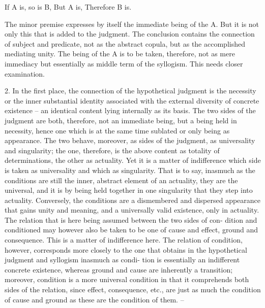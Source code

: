 If A is, so is B,
But A is,
Therefore B is.

The minor premise expresses by itself
the immediate being of the A.
But it is not only this that is added to the judgment.
The conclusion contains the connection of subject and predicate,
not as the abstract copula,
but as the accomplished mediating unity. 
The being of the A is to be taken, therefore, 
not as mere immediacy but essentially
as middle term of the syllogism. 
This needs closer examination.

2. In the first place, the connection of the hypothetical judgment is
the necessity or the inner substantial identity associated with the external
diversity of concrete existence – an identical content lying internally as its
basis. The two sides of the judgment are both, therefore, not an immediate
being, but a being held in necessity, hence one which is at the same time
sublated or only being as appearance. The two behave, moreover, as sides
of the judgment, as universality and singularity; the one, therefore, is the
above content as totality of determinations, the other as actuality. Yet it is
a matter of indifference which side is taken as universality and which as
singularity. That is to say, inasmuch as the conditions are still the inner,
abstract element of an actuality, they are the universal, and it is by being
held together in one singularity that they step into actuality. Conversely, the
conditions are a dismembered and dispersed appearance that gains unity and
meaning, and a universally valid existence, only in actuality.
The relation that is here being assumed between the two sides of con-
dition and conditioned may however also be taken to be one of cause and
effect, ground and consequence. This is a matter of indifference here. The
relation of condition, however, corresponds more closely to the one that
obtains in the hypothetical judgment and syllogism inasmuch as condi-
tion is essentially an indifferent concrete existence, whereas ground and
cause are inherently a transition; moreover, condition is a more universal
condition in that it comprehends both sides of the relation, since effect,
consequence, etc., are just as much the condition of cause and ground as
these are the condition of them. –

